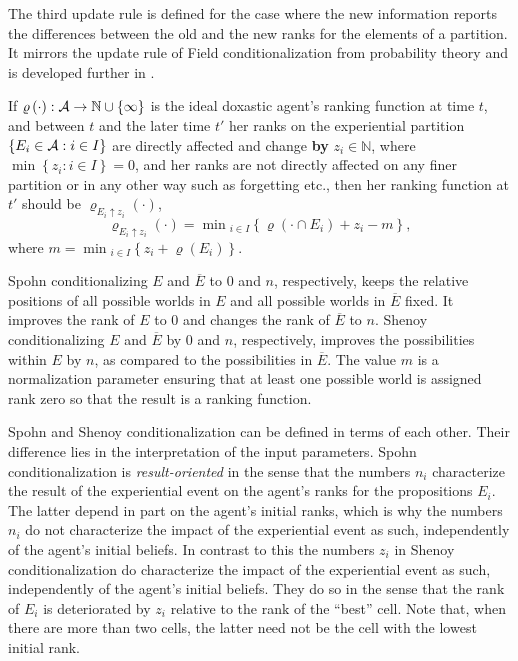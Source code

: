 The third update rule is defined for the case where the new information reports the differences between the old and the new ranks for the elements of a partition. It mirrors the update rule of Field conditionalization from probability theory \citep{f78} and is developed further in \citet{b13} .
\begin{update}\label{rankrule3}
If $\varrho\left(\cdot\right):\begin{cal}A\end{cal}\rightarrow\mathbb{N}\cup\left\{\infty\right\}$ is the ideal doxastic agent's ranking function at time $t$, and between $t$ and the later time $t'$ her ranks on the experiential partition $\left\{E_i\in\begin{cal}A\end{cal}:i\in I\right\}$ are directly affected and change \textbf{by} $z_i\in\mathbb{N}$, where $\min\left\{z_i:i\in I\right\}=0$, and her %
ranks are not directly affected on any finer partition or in any other way such as forgetting etc., then her ranking function at $t'$ should be $\varrho_{E_i\uparrow z_i}\left(\cdot\right)$,
$$\varrho_{E_i\uparrow z_i}\left(\cdot\right)=\min{_{i\in I}}\left\{\varrho\left(\cdot\cap E_i\right)+z_i-m\right\},$$
where $m=\min{_{i\in I}}\left\{z_i+\varrho\left(E_i\right)\right\}$.
\end{update}
Spohn conditionalizing $E$ and $\overline{E}$ to $0$ and $n$, respectively, keeps the relative positions of all possible worlds in $E$ and all possible worlds in $\overline{E}$ fixed. It improves the rank of $E$ to $0$ and changes the rank of $\overline{E}$ to $n$. Shenoy conditionalizing $E$ and $\overline{E}$ by $0$ and $n$, respectively, improves the possibilities within $E$ by $n$, as compared to the possibilities in $\overline{E}$. The value $m$ is a normalization parameter ensuring that at least one possible world is assigned rank zero so that the result is a ranking function.

Spohn and Shenoy conditionalization can be defined in terms of each other. Their difference lies in the interpretation of the input parameters. Spohn conditionalization is \emph{result-oriented} in the sense that the numbers $n_i$ characterize the result of the experiential event on the agent's ranks for the propositions $E_i$. The latter depend in part on the agent's initial ranks, which is why the numbers $n_i$ do not characterize the impact of the experiential event as such, independently of the agent's initial beliefs. In contrast to this the numbers $z_i$ in Shenoy conditionalization do characterize the impact of the experiential event as such, independently of the agent's initial beliefs. They do so in the sense that the rank of $E_i$ is deteriorated by $z_i$ relative to the rank of the ``best'' cell. Note that, when there are more than two cells, the latter need not be the cell with the lowest initial rank.%

